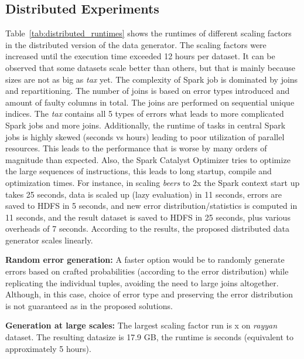 \subsection{Distributed Experiments}
\label{sec:runtime_distributed}

Table~\ref{tab:distributed_runtimes} shows the runtimes of different scaling factors in the distributed version of the data generator.
The scaling factors were increased until the execution time exceeded 12 hours per dataset.
It can be observed that some datasets scale better than others, but that is mainly because sizes are not as big as \textit{tax} yet. 
The complexity of Spark job is dominated by joins and repartitioning.
The number of joins is based on error types introduced and amount of faulty columns in total.
The joins are performed on sequential unique indices.
The \textit{tax} contains all 5 types of errors what leads to more complicated Spark jobs and more joins.
Additionally, the runtime of tasks in central Spark jobs is highly skewed (seconds vs hours) leading to poor utilization of parallel resources.
This leads to the performance that is worse by many orders of magnitude than expected.
Also, the Spark Catalyst Optimizer tries to optimize the large sequences of instructions, this leads to long startup, compile and optimization times. 
For instance, in scaling \textit{beers} to 2x the Spark context start up takes 25 seconds, data is scaled up (lazy evaluation) in 11 seconds, errors are saved to HDFS in 5 seconds, and new error distribution/statistics is computed in 11 seconds, and the result dataset is saved to HDFS in 25 seconds, plus various overheads of 7 seconds.
According to the results, the proposed distributed data generator scales linearly.

\textbf{Random error generation:} 
A faster option would be to randomly generate errors based on crafted probabilities (according to the error distribution) while replicating the individual tuples, avoiding the need to large joins altogether.
Although, in this case, choice of error type and preserving the error distribution is not guaranteed as in the proposed solutions.

\textbf{Generation at large scales:} 
The largest scaling factor run is x on \textit{rayyan} dataset. 
The resulting datasize is 17.9 GB, the runtime is  seconds (equivalent to approximately 5 hours).

